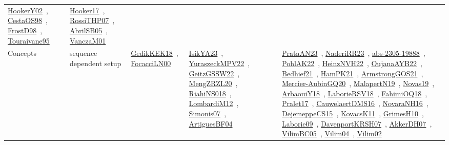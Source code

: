 {\begin{longtable}{lp{3cm}>{\raggedright\arraybackslash}p{6cm}>{\raggedright\arraybackslash}p{6cm}>{\raggedright\arraybackslash}p{8cm}}
\href{papers/HookerY02.pdf}{HookerY02}~\cite{HookerY02}, \href{papers/CestaOS98.pdf}{CestaOS98}~\cite{CestaOS98}, \href{papers/FrostD98.pdf}{FrostD98}~\cite{FrostD98}, \href{papers/Touraivane95.pdf}{Touraivane95}~\cite{Touraivane95} & \href{papers/Hooker17.pdf}{Hooker17}~\cite{Hooker17}, \href{papers/RossiTHP07.pdf}{RossiTHP07}~\cite{RossiTHP07}, \href{papers/AbrilSB05.pdf}{AbrilSB05}~\cite{AbrilSB05}, \href{papers/VanczaM01.pdf}{VanczaM01}~\cite{VanczaM01}\\
Concepts & sequence dependent setup & \href{articles/GedikKEK18.pdf}{GedikKEK18}~\cite{GedikKEK18}, \href{papers/FocacciLN00.pdf}{FocacciLN00}~\cite{FocacciLN00} & \href{articles/IsikYA23.pdf}{IsikYA23}~\cite{IsikYA23}, \href{articles/YuraszeckMPV22.pdf}{YuraszeckMPV22}~\cite{YuraszeckMPV22}, \href{papers/GeitzGSSW22.pdf}{GeitzGSSW22}~\cite{GeitzGSSW22}, \href{articles/MengZRZL20.pdf}{MengZRZL20}~\cite{MengZRZL20}, \href{papers/RiahiNS018.pdf}{RiahiNS018}~\cite{RiahiNS018}, \href{articles/LombardiM12.pdf}{LombardiM12}~\cite{LombardiM12}, \href{articles/Simonis07.pdf}{Simonis07}~\cite{Simonis07}, \href{papers/ArtiguesBF04.pdf}{ArtiguesBF04}~\cite{ArtiguesBF04} & \href{articles/PrataAN23.pdf}{PrataAN23}~\cite{PrataAN23}, \href{articles/NaderiRR23.pdf}{NaderiRR23}~\cite{NaderiRR23}, \href{articles/abs-2305-19888.pdf}{abs-2305-19888}~\cite{abs-2305-19888}, \href{articles/PohlAK22.pdf}{PohlAK22}~\cite{PohlAK22}, \href{articles/HeinzNVH22.pdf}{HeinzNVH22}~\cite{HeinzNVH22}, \href{papers/OujanaAYB22.pdf}{OujanaAYB22}~\cite{OujanaAYB22}, \href{articles/Bedhief21.pdf}{Bedhief21}~\cite{Bedhief21}, \href{articles/HamPK21.pdf}{HamPK21}~\cite{HamPK21}, \href{papers/ArmstrongGOS21.pdf}{ArmstrongGOS21}~\cite{ArmstrongGOS21}, \href{papers/Mercier-AubinGQ20.pdf}{Mercier-AubinGQ20}~\cite{Mercier-AubinGQ20}, \href{papers/MalapertN19.pdf}{MalapertN19}~\cite{MalapertN19}, \href{articles/Novas19.pdf}{Novas19}~\cite{Novas19}, \href{papers/ArbaouiY18.pdf}{ArbaouiY18}~\cite{ArbaouiY18}, \href{articles/LaborieRSV18.pdf}{LaborieRSV18}~\cite{LaborieRSV18}, \href{articles/FahimiOQ18.pdf}{FahimiOQ18}~\cite{FahimiOQ18}, \href{papers/Pralet17.pdf}{Pralet17}~\cite{Pralet17}, \href{papers/CauwelaertDMS16.pdf}{CauwelaertDMS16}~\cite{CauwelaertDMS16}, \href{articles/NovaraNH16.pdf}{NovaraNH16}~\cite{NovaraNH16}, \href{papers/DejemeppeCS15.pdf}{DejemeppeCS15}~\cite{DejemeppeCS15}, \href{articles/KovacsK11.pdf}{KovacsK11}~\cite{KovacsK11}, \href{papers/GrimesH10.pdf}{GrimesH10}~\cite{GrimesH10}, \href{papers/Laborie09.pdf}{Laborie09}~\cite{Laborie09}, \href{papers/DavenportKRSH07.pdf}{DavenportKRSH07}~\cite{DavenportKRSH07}, \href{papers/AkkerDH07.pdf}{AkkerDH07}~\cite{AkkerDH07}, \href{articles/VilimBC05.pdf}{VilimBC05}~\cite{VilimBC05}, \href{papers/Vilim04.pdf}{Vilim04}~\cite{Vilim04}, \href{papers/Vilim02.pdf}{Vilim02}~\cite{Vilim02}\\

\end{longtable}}
